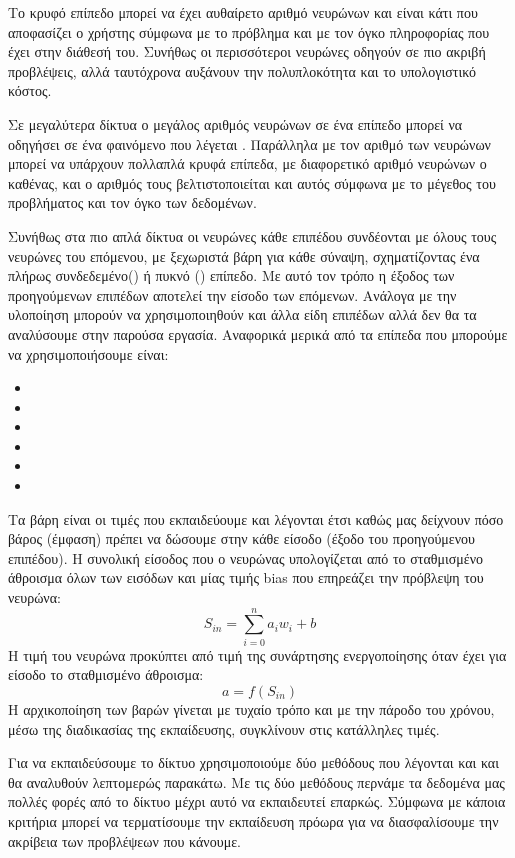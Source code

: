 Το
κρυφό επίπεδο μπορεί να έχει αυθαίρετο αριθμό νευρώνων και είναι κάτι που αποφασίζει ο χρήστης
σύμφωνα με το πρόβλημα και με τον όγκο πληροφορίας που έχει στην διάθεσή του. Συνήθως
οι περισσότεροι νευρώνες οδηγούν σε πιο ακριβή προβλέψεις, αλλά ταυτόχρονα αυξάνουν
την πολυπλοκότητα και το υπολογιστικό κόστος.

Σε μεγαλύτερα δίκτυα ο μεγάλος αριθμός
νευρώνων σε ένα επίπεδο μπορεί να οδηγήσει σε ένα φαινόμενο που λέγεται . Παράλληλα με τον αριθμό των νευρώνων μπορεί να υπάρχουν
πολλαπλά κρυφά επίπεδα, με διαφορετικό αριθμό νευρώνων ο καθένας, και ο αριθμός τους
βελτιστοποιείται και αυτός σύμφωνα με το μέγεθος του προβλήματος και τον όγκο των
δεδομένων.

Συνήθως στα πιο απλά δίκτυα οι νευρώνες κάθε επιπέδου συνδέονται με όλους τους
νευρώνες του επόμενου, με ξεχωριστά βάρη για κάθε σύναψη, σχηματίζοντας ένα πλήρως
συνδεδεμένο() ή πυκνό () επίπεδο. Με αυτό τον τρόπο η έξοδος των
προηγούμενων επιπέδων αποτελεί την είσοδο των επόμενων. Ανάλογα με την υλοποίηση
μπορούν να χρησιμοποιηθούν και άλλα είδη επιπέδων αλλά δεν θα τα αναλύσουμε στην
παρούσα εργασία. Αναφορικά μερικά από τα επίπεδα που μπορούμε να χρησιμοποιήσουμε
είναι:
\begin{itemize}
    \item {}
    \item {}
    \item {}
    \item {}
    \item {}
    \item {}
\end{itemize}

Τα βάρη είναι οι τιμές που εκπαιδεύουμε και λέγονται έτσι καθώς μας δείχνουν πόσο βάρος
(έμφαση) πρέπει να δώσουμε στην κάθε είσοδο (έξοδο του προηγούμενου επιπέδου). Η
συνολική είσοδος που  ο νευρώνας υπολογίζεται από το σταθμισμένο άθροισμα
όλων των εισόδων και μίας τιμής bias που επηρεάζει την πρόβλεψη του νευρώνα:
$$S_{in}=\sum\limits_{i=0}^na_iw_i+b$$
Η τιμή του νευρώνα προκύπτει από τιμή της συνάρτησης ενεργοποίησης όταν έχει για είσοδο
το σταθμισμένο άθροισμα:
$$a=f(S_{in})$$
Η αρχικοποίηση των βαρών γίνεται με τυχαίο τρόπο και με την πάροδο του χρόνου, μέσω της
διαδικασίας της εκπαίδευσης, συγκλίνουν στις κατάλληλες τιμές.

Για να εκπαιδεύσουμε το δίκτυο χρησιμοποιούμε δύο μεθόδους που λέγονται  και
 και θα αναλυθούν λεπτομερώς παρακάτω. Με τις δύο μεθόδους περνάμε
τα δεδομένα μας πολλές φορές από το δίκτυο μέχρι αυτό να εκπαιδευτεί επαρκώς. Σύμφωνα
με κάποια κριτήρια μπορεί να τερματίσουμε την εκπαίδευση πρόωρα για να διασφαλίσουμε
την ακρίβεια των προβλέψεων που κάνουμε.
